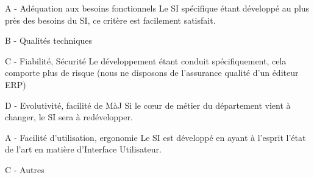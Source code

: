 A - Adéquation aux besoins fonctionnels
Le SI spécifique étant développé au plus près des besoins du SI, ce critère
est facilement satisfait.

B - Qualités techniques

	C - Fiabilité, Sécurité
Le développement étant conduit spécifiquement, cela comporte plus de risque
(nous ne disposons de l'assurance qualité d'un éditeur ERP)

	D - Evolutivité, facilité de MàJ
Si le c\oe{}ur de métier du département vient à changer, le SI sera à
redévelopper.

	A - Facilité d'utilisation, ergonomie
Le SI est développé en ayant à l'esprit l'état de l'art en matière
d'Interface Utilisateur.

C - Autres

